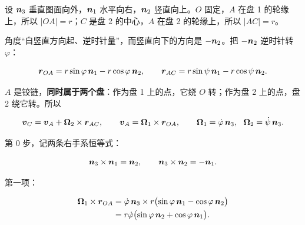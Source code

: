 \documentclass[11pt]{ctexart}
\begin{document}

设 $\boldsymbol{n}_3$ 垂直图面向外，$\boldsymbol{n}_1$ 水平向右，$\boldsymbol{n}_2$ 竖直向上。$O$ 固定，$A$ 在盘 1 的轮缘上，所以 $|OA|=r$；$C$ 是盘 2 的中心，$A$ 在盘 2 的轮缘上，所以 $|AC|=r$。

角度“自竖直方向起、逆时针量”，而竖直向下的方向是 $-\boldsymbol{n}_2$。把 $-\boldsymbol{n}_2$ 逆时针转 $\varphi$：

\[
\boldsymbol{r}_{OA}=r\sin\varphi\,\boldsymbol{n}_1-r\cos\varphi\,\boldsymbol{n}_2,
\qquad
\boldsymbol{r}_{AC}=r\sin\psi\,\boldsymbol{n}_1-r\cos\psi\,\boldsymbol{n}_2 .
\]



$A$ 是铰链，\textbf{同时属于两个盘}：作为盘 1 上的点，它绕 $O$ 转；作为盘 2 上的点，盘 2 绕它转。所以

\[
\vect{v}_C=\vect{v}_A+\vect{\Omega}_2\times\vect{r}_{AC},
\qquad
\vect{v}_A=\vect{\Omega}_1\times\vect{r}_{OA},
\qquad
\vect{\Omega}_1=\dot\varphi\,\vect{n}_3,\ \ \vect{\Omega}_2=\dot\psi\,\vect{n}_3 .
\]



第 0 步，记两条右手系恒等式：

\[
\boldsymbol{n}_3\times\boldsymbol{n}_1=\boldsymbol{n}_2,\qquad \boldsymbol{n}_3\times\boldsymbol{n}_2=-\boldsymbol{n}_1 .
\]


第一项：

\[
\begin{aligned}
\boldsymbol{\Omega}_1\times\boldsymbol{r}_{OA}
&=\dot\varphi\,\boldsymbol{n}_3\times r\bigl(\sin\varphi\,\boldsymbol{n}_1-\cos\varphi\,\boldsymbol{n}_2\bigr)\\
&=r\dot\varphi\bigl(\sin\varphi\,\boldsymbol{n}_2+\cos\varphi\,\boldsymbol{n}_1\bigr).
\end{aligned}
\]

\end{document}
